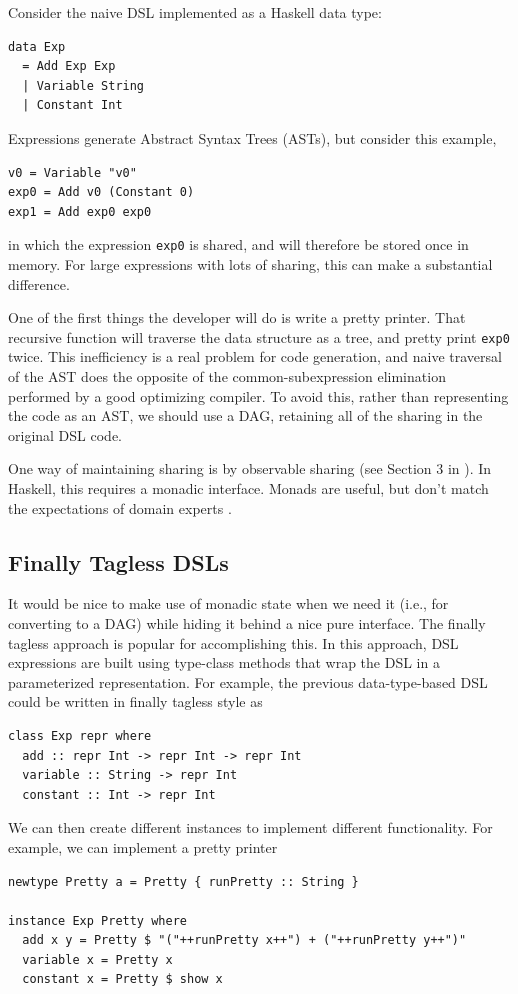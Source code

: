 \documentclass[runningheads]{llncs}
\begin{document}
Consider the naive DSL implemented as a Haskell data type:
\begin{verbatim}
data Exp
  = Add Exp Exp
  | Variable String
  | Constant Int
\end{verbatim}
Expressions generate Abstract Syntax Trees (ASTs),
but consider this example,
\begin{verbatim}
v0 = Variable "v0"
exp0 = Add v0 (Constant 0)
exp1 = Add exp0 exp0
\end{verbatim}
in which the expression  \texttt{exp0} is shared,
and will therefore be stored once in memory.
For large expressions with lots of sharing,
this can make a substantial difference.

One of the first things the developer will do is write a pretty printer.
That recursive function will traverse the data structure as a tree,
and pretty print \texttt{exp0} twice.
This inefficiency is a real problem for code generation,
and naive traversal of the AST does the opposite of the common-subexpression elimination performed by a good optimizing compiler.
To avoid this,
rather than representing the code as an AST, 
we should use a DAG, retaining all of the sharing in the original DSL code. 

One way of maintaining sharing is by observable sharing (see Section 3 in \cite{kiselyov:sharing}).
In Haskell, this requires a monadic interface.
Monads are useful, but don't match the expectations of domain experts \cite{odonnell:embedding}.

\subsection{Finally Tagless DSLs}

 It would be nice
to make use of monadic state when we need it (i.e., for converting to a DAG)
while hiding it behind a nice pure interface. The finally tagless approach
\cite{carette:finallytagless} is popular for accomplishing this. In this
approach, DSL expressions are built using type-class methods that wrap the DSL in
a parameterized representation. For example, the previous data-type-based DSL
could be written in finally tagless style as

\begin{verbatim}
class Exp repr where
  add :: repr Int -> repr Int -> repr Int
  variable :: String -> repr Int
  constant :: Int -> repr Int
\end{verbatim}

We can then create different instances to implement different functionality.
For example, we can implement a pretty printer
\begin{verbatim}
newtype Pretty a = Pretty { runPretty :: String }

instance Exp Pretty where
  add x y = Pretty $ "("++runPretty x++") + ("++runPretty y++")"
  variable x = Pretty x
  constant x = Pretty $ show x
\end{verbatim}
\end{document}
